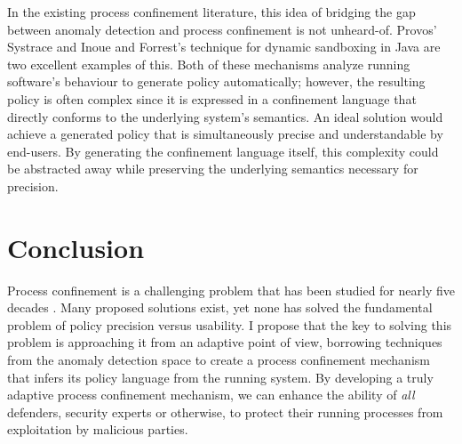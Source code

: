 \documentclass[dvipsnames, 12pt]{article}
\begin{document}
In the existing process confinement literature, this idea of bridging the gap
between anomaly detection and process confinement is not unheard-of. Provos'
Systrace \cite{provos2003_systrace} and Inoue and Forrest's technique for
dynamic sandboxing in Java \cite{inoue05_java, inoue05_thesis} are two excellent
examples of this. Both of these mechanisms analyze running software's behaviour
to generate policy automatically; however, the resulting policy is often complex
since it is expressed in a confinement language that directly conforms to the
underlying system's semantics. An ideal solution would achieve a generated
policy that is simultaneously precise and understandable by end-users. By
generating the confinement language itself, this complexity could be abstracted
away while preserving the underlying semantics necessary for precision.

%

\section{Conclusion}
\label{sec:conclusion}

Process confinement is a challenging problem that has been studied for nearly
five decades \cite{lampson1973_a_note}. Many proposed solutions exist, yet none
has solved the fundamental problem of policy precision versus usability.
I propose that the key to solving this problem is approaching it from an
adaptive point of view, borrowing techniques from the anomaly detection space to
create a process confinement mechanism that infers its policy language from the
running system. By developing a truly adaptive process confinement mechanism, we
can enhance the ability of \textit{all} defenders, security experts or
otherwise, to protect their running processes from exploitation by malicious
parties.

\singlespacing
\printbibliography
\end{document}
